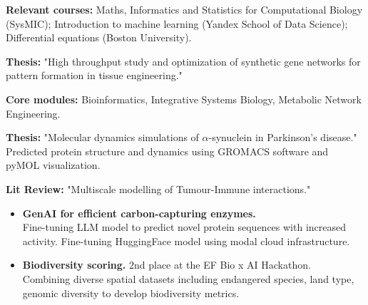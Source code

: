 \documentclass[10pt,a4paper,ragged2e,withhyper]{altacv}
\begin{document}
\begin{paracol}{2}
\divider

\textbf{Relevant courses:} Maths, Informatics and Statistics for Computational Biology (SysMIC); Introduction to machine learning (Yandex School of Data Science); Differential equations (Boston University). 

\vspace{0.2cm}

\textbf{Thesis:} "High throughput study and optimization of synthetic gene networks for pattern formation in tissue engineering."

\divider



\textbf{Core modules:} Bioinformatics, Integrative Systems Biology, Metabolic Network Engineering.
\vspace{0.2cm}

\textbf{Thesis:} "Molecular dynamics simulations of $\alpha$-synuclein in Parkinson's disease." Predicted protein structure and dynamics using GROMACS software and pyMOL visualization.  

\vspace{0.2cm}
\textbf{Lit Review:} "Multiscale modelling of Tumour-Immune interactions."






\begin{itemize}

\item \textbf{GenAI for efficient carbon-capturing enzymes.}
\\Fine-tuning LLM model to predict novel protein sequences with increased activity. Fine-tuning HuggingFace model using modal cloud infrastructure. 
\item \textbf{Biodiversity scoring.} 2nd place at the EF Bio x AI Hackathon.\\ Combining diverse spatial datasets including endangered species, land type, genomic diversity to develop biodiversity metrics. 


\end{itemize}
\end{paracol}
\end{document}
